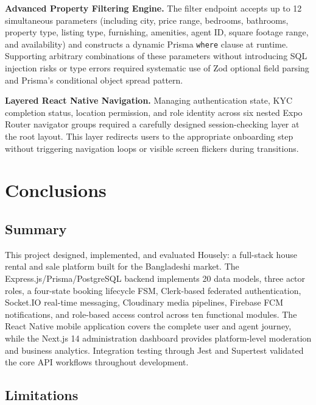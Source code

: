 \documentclass[12pt,a4paper]{report}
\begin{document}
\textbf{Advanced Property Filtering Engine.}
The filter endpoint accepts up to 12 simultaneous parameters (including city, price range,
bedrooms, bathrooms, property type, listing type, furnishing, amenities, agent ID, square
footage range, and availability) and constructs a dynamic Prisma \texttt{where} clause at
runtime. Supporting arbitrary combinations of these parameters without introducing SQL
injection risks or type errors required systematic use of Zod optional field parsing and
Prisma's conditional object spread pattern.

\textbf{Layered React Native Navigation.}
Managing authentication state, KYC completion status, location permission, and role
identity across six nested Expo Router navigator groups required a carefully designed
session-checking layer at the root layout. This layer redirects users to the appropriate
onboarding step without triggering navigation loops or visible screen flickers during
transitions.

\chapter{Conclusions}
\label{chap:conc}

\section{Summary}

This project designed, implemented, and evaluated Housely: a full-stack house rental and
sale platform built for the Bangladeshi market. The Express.js/Prisma/PostgreSQL backend
implements 20 data models, three actor roles, a four-state booking lifecycle FSM,
Clerk-based federated authentication, Socket.IO real-time messaging,
Cloudinary media pipelines, Firebase FCM notifications, and role-based access control across
ten functional modules. The React Native mobile application covers the complete user and
agent journey, while the Next.js 14 administration dashboard provides platform-level
moderation and business analytics. Integration testing through Jest and Supertest validated
the core API workflows throughout development.

\section{Limitations}
\end{document}
